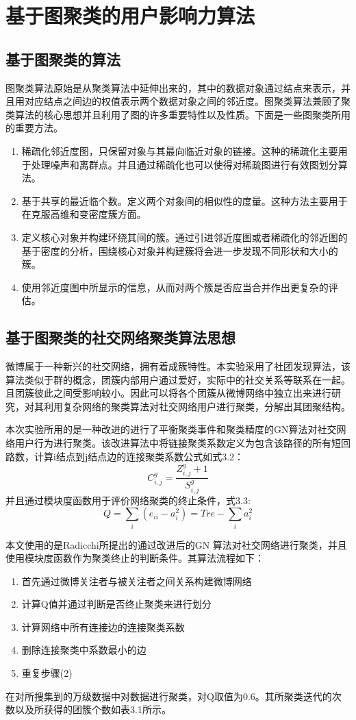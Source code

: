 \section{基于图聚类的用户影响力算法}
\subsection{基于图聚类的算法}
图聚类算法原始是从聚类算法中延伸出来的，其中的数据对象通过结点来表示，并且用对应结点之间边的权值表示两个数据对象之间的邻近度。图聚类算法兼顾了聚类算法的核心思想并且利用了图的许多重要特性以及性质。下面是一些图聚类所用的重要方法。

\begin{enumerate}[(1)]
	\item 稀疏化邻近度图，只保留对象与其最向临近对象的链接。这种的稀疏化主要用于处理噪声和离群点。并且通过稀疏化也可以使得对稀疏图进行有效图划分算法。
	\item 基于共享的最近临个数。定义两个对象间的相似性的度量。这种方法主要用于在克服高维和变密度簇方面。
	\item 定义核心对象并构建环绕其间的簇。通过引进邻近度图或者稀疏化的邻近图的基于密度的分析，围绕核心对象并构建簇将会进一步发现不同形状和大小的簇。
	\item 使用邻近度图中所显示的信息，从而对两个簇是否应当合并作出更复杂的评估。
\end{enumerate}

\subsection{基于图聚类的社交网络聚类算法思想}
微博属于一种新兴的社交网络，拥有着成簇特性。本实验采用了社团发现算法，该算法类似于群的概念，团簇内部用户通过爱好，实际中的社交关系等联系在一起。且团簇彼此之间受影响较小。因此可以将各个团簇从微博网络中独立出来进行研究，对其利用复杂网络的聚类算法对社交网络用户进行聚类，分解出其团聚结构。
\par
本次实验所用的是一种改进的进行了平衡聚类事件和聚类精度的GN算法对社交网络用户行为进行聚类。该改进算法中将链接聚类系数定义为包含该路径的所有短回路数，计算i结点到j结点边的连接聚类系数公式如式3.2：
\begin{equation}
C_{i,j}^{g}=\frac{Z_{i,j}^{g}+1}{S_{i,j}^g}
\end{equation}
并且通过模块度函数用于评价网络聚类的终止条件，式3.3:
\begin{equation}
Q=\sum_{i}{(e_{ii}-a_i^2)}=Tre-\sum_{i}a_i^2
\end{equation}

本文使用的是Radicchi所提出的通过改进后的GN 算法对社交网络进行聚类，并且使用模块度函数作为聚类终止的判断条件。其算法流程如下：
\begin{enumerate}[(1)]
	\item 首先通过微博关注者与被关注者之间关系构建微博网络
	\item 计算Q值并通过判断是否终止聚类来进行划分
	\item 计算网络中所有连接边的连接聚类系数
	\item 删除连接聚类中系数最小的边
	\item 重复步骤(2)
\end{enumerate}
在对所搜集到的万级数据中对数据进行聚类，对Q取值为0.6。其所聚类迭代的次数以及所获得的团簇个数如表3.1所示。

